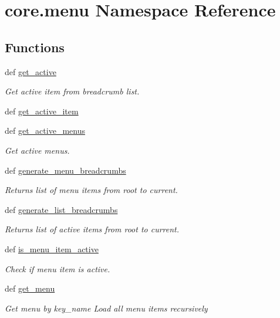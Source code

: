 \hypertarget{namespacecore_1_1menu}{\section{core.\-menu Namespace Reference}
\label{namespacecore_1_1menu}
}
\subsection*{Functions}
\begin{DoxyCompactItemize}
\item 
def \hyperlink{namespacecore_1_1menu_a7c2664997b3f1cb3bd63598c249662b2}{get\-\_\-active}
\begin{DoxyCompactList}\small\item\em Get active item from breadcrumb list. \end{DoxyCompactList}\item 
def \hyperlink{namespacecore_1_1menu_a219c2a629a38b39275c48d36d8d17404}{get\-\_\-active\-\_\-item}
\item 
def \hyperlink{namespacecore_1_1menu_a7aa117b80cfab4cb469895ef9f267c71}{get\-\_\-active\-\_\-menus}
\begin{DoxyCompactList}\small\item\em Get active menus. \end{DoxyCompactList}\item 
def \hyperlink{namespacecore_1_1menu_ae541fb5a641928721ef49f10b49c1676}{generate\-\_\-menu\-\_\-breadcrumbs}
\begin{DoxyCompactList}\small\item\em Returns list of menu items from root to current. \end{DoxyCompactList}\item 
def \hyperlink{namespacecore_1_1menu_a869d9e677c44ff4b0f97998a35af2e03}{generate\-\_\-list\-\_\-breadcrumbs}
\begin{DoxyCompactList}\small\item\em Returns list of active items from root to current. \end{DoxyCompactList}\item 
def \hyperlink{namespacecore_1_1menu_a9fef8eaad85e28126aafffcba159fc66}{is\-\_\-menu\-\_\-item\-\_\-active}
\begin{DoxyCompactList}\small\item\em Check if menu item is active. \end{DoxyCompactList}\item 
def \hyperlink{namespacecore_1_1menu_a6898943b9c5b844ff1adf17720e10690}{get\-\_\-menu}
\begin{DoxyCompactList}\small\item\em Get menu by key\-\_\-name Load all menu items recursively \end{DoxyCompactList}\end{DoxyCompactItemize}


